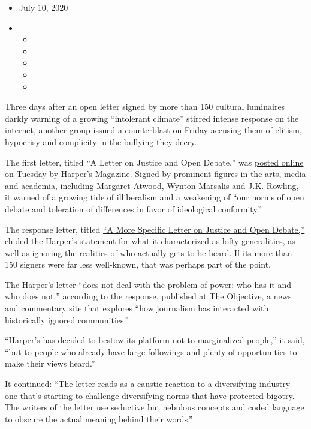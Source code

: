 \begin{itemize}
\item
  July 10, 2020
\item
  \begin{itemize}
  \item
  \item
  \item
  \item
  \item
  \end{itemize}
\end{itemize}

Three days after an open letter signed by more than 150 cultural
luminaires darkly warning of a growing ``intolerant climate'' stirred
intense response on the internet, another group issued a counterblast on
Friday accusing them of elitism, hypocrisy and complicity in the
bullying they decry.

The first letter, titled ``A Letter on Justice and Open Debate,'' was
\href{https://www.nytimes.com/2020/07/07/arts/harpers-letter.html?searchResultPosition=1}{posted
online} on Tuesday by Harper's Magazine. Signed by prominent figures in
the arts, media and academia, including Margaret Atwood, Wynton Marsalis
and J.K. Rowling, it warned of a growing tide of illiberalism and a
weakening of ``our norms of open debate and toleration of differences in
favor of ideological conformity.''

The response letter, titled
\href{https://theobjective.substack.com/p/a-more-specific-letter-on-justice}{``A
More Specific Letter on Justice and Open Debate,''} chided the Harper's
statement for what it characterized as lofty generalities, as well as
ignoring the realities of who actually gets to be heard. If its more
than 150 signers were far less well-known, that was perhaps part of the
point.

The Harper's letter ``does not deal with the problem of power: who has
it and who does not,'' according to the response, published at The
Objective, a news and commentary site that explores ``how journalism has
interacted with historically ignored communities.''

``Harper's has decided to bestow its platform not to marginalized
people,'' it said, ``but to people who already have large followings and
plenty of opportunities to make their views heard.''

It continued: ``The letter reads as a caustic reaction to a diversifying
industry --- one that's starting to challenge diversifying norms that
have protected bigotry. The writers of the letter use seductive but
nebulous concepts and coded language to obscure the actual meaning
behind their words.''

